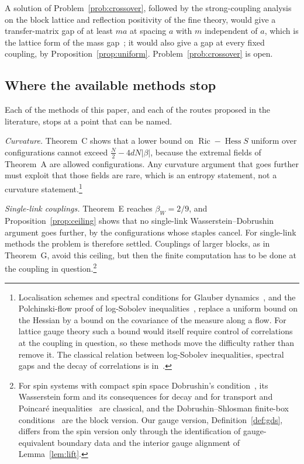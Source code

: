\documentclass[aps,prd,twocolumn,superscriptaddress,nofootinbib,longbibliography,floatfix,amsmath,amssymb,10pt]{revtex4-2}
\theoremstyle{definition}
\theoremstyle{remark}
\newcommand{\Hess}{\operatorname{Hess}}
\newcommand{\Ric}{\operatorname{Ric}}
\begin{document}
A solution of Problem~\ref{prob:crossover}, followed by the strong-coupling
analysis on the block lattice and reflection positivity of the fine theory,
would give a transfer-matrix gap of at least $ma$ at spacing $a$ with $m$
independent of $a$, which is the lattice form of the mass gap~\cite{BB26}; it
would also give a gap at every fixed coupling, by Proposition~\ref{prop:uniform}.
Problem~\ref{prob:crossover} is open.

\subsection{Where the available methods stop}

Each of the methods of this paper, and each of the routes proposed in the
literature, stops at a point that can be named.

\emph{Curvature.} Theorem~C shows that a lower bound on $\Ric-\Hess S$
uniform over configurations cannot exceed $\frac N2-4dN|\beta|$, because
the extremal fields of Theorem~A are allowed configurations. Any curvature
argument that goes further must exploit that those fields are rare, which
is an entropy statement, not a curvature statement.\footnote{Localisation
schemes and spectral conditions for Glauber dynamics~\cite{EKZ21,CE25}, and
the Polchinski-flow proof of log-Sobolev inequalities~\cite{BBo19}, replace
a uniform bound on the Hessian by a bound on the covariance of the measure
along a flow. For lattice gauge theory such a bound would itself require
control of correlations at the coupling in question, so these methods move
the difficulty rather than remove it. The classical relation between
log-Sobolev inequalities, spectral gaps and the decay of correlations is
in~\cite{Gro75,HS87,SZ92,Zeg96,MO94,OV00,Led01}.}

\emph{Single-link couplings.} Theorem~E reaches $\beta_W=2/9$, and
Proposition~\ref{prop:ceiling} shows that no single-link
Wasserstein--Dobrushin argument goes further, by the configurations whose
staples cancel. For single-link methods the problem is therefore settled. Couplings of larger blocks, as in
Theorem~G, avoid this ceiling, but then the finite computation has to be
done at the coupling in question.\footnote{For spin systems with compact
spin space Dobrushin's condition~\cite{Dob68,Dob70}, its Wasserstein form
and its consequences for decay and for transport and Poincar\'e
inequalities~\cite{Fol82,Kun82,Wu06,Oll09,DSa23} are classical, and the
Dobrushin--Shlosman finite-box conditions~\cite{DS85,DS87} are the block
version. Our gauge version, Definition~\ref{def:gds}, differs from the spin
version only through the identification of gauge-equivalent boundary data
and the interior gauge alignment of Lemma~\ref{lem:lift}.}
\end{document}
